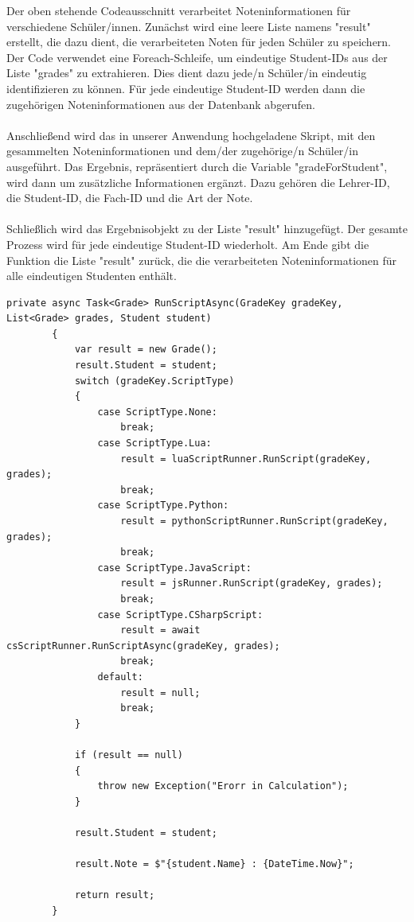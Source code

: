 Der oben stehende Codeausschnitt verarbeitet Noteninformationen für verschiedene Schüler/innen. 
Zunächst wird eine leere Liste namens "result" erstellt, die dazu dient, die verarbeiteten Noten für 
jeden Schüler zu speichern. Der Code verwendet eine Foreach-Schleife, um eindeutige Student-IDs aus 
der Liste "grades" zu extrahieren. Dies dient dazu jede/n Schüler/in eindeutig identifizieren zu können.
Für jede eindeutige Student-ID werden dann die zugehörigen Noteninformationen aus der Datenbank abgerufen.
\\\\
Anschließend wird das in unserer Anwendung hochgeladene Skript, mit den gesammelten Noteninformationen 
und dem/der zugehörige/n Schüler/in ausgeführt. Das Ergebnis, repräsentiert durch die Variable "gradeForStudent", 
wird dann um zusätzliche Informationen ergänzt. Dazu gehören die Lehrer-ID, die Student-ID, 
die Fach-ID und die Art der Note.
\\\\
Schließlich wird das Ergebnisobjekt zu der Liste "result" hinzugefügt. Der gesamte Prozess wird für 
jede eindeutige Student-ID wiederholt. Am Ende gibt die Funktion die Liste "result" zurück, die die 
verarbeiteten Noteninformationen für alle eindeutigen Studenten enthält.

        
\newpage
\begin{lstlisting}[language={[Sharp]C}, caption=Code for handing the Script-Type, label=lst:imp:calc]               
        private async Task<Grade> RunScriptAsync(GradeKey gradeKey, List<Grade> grades, Student student)
        {
            var result = new Grade();
            result.Student = student;
            switch (gradeKey.ScriptType)
            {
                case ScriptType.None:
                    break;
                case ScriptType.Lua:
                    result = luaScriptRunner.RunScript(gradeKey, grades);
                    break;
                case ScriptType.Python:
                    result = pythonScriptRunner.RunScript(gradeKey, grades);
                    break;
                case ScriptType.JavaScript:
                    result = jsRunner.RunScript(gradeKey, grades);
                    break;
                case ScriptType.CSharpScript:
                    result = await csScriptRunner.RunScriptAsync(gradeKey, grades);
                    break;
                default:
                    result = null;
                    break;
            }

            if (result == null)
            {
                throw new Exception("Erorr in Calculation");
            }

            result.Student = student;

            result.Note = $"{student.Name} : {DateTime.Now}";

            return result;
        }
\end{lstlisting}

